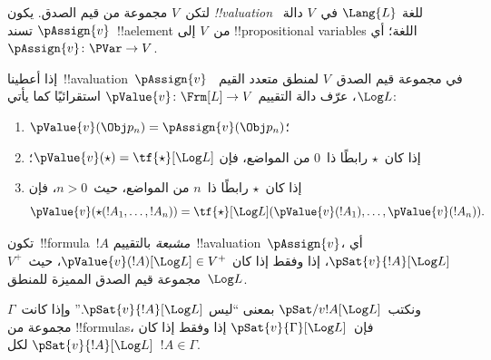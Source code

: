 \documentclass[../../../include/open-logic-section]{subfiles}
\begin{document}


\begin{defn}[!!^{valuation}s]
لتكن~$V$ مجموعة من قيم الصدق. يكون \emph{!!{valuation}} للغة
$\Lang{L}$ في~$V$ دالة~$\pAssign{v}$ تسند~!!a{element} من~$V$ إلى
!!{propositional variable}s اللغة؛ أي
$\pAssign{v} \colon \PVar \to V$.
\end{defn}

\begin{defn}
  إذا أعطينا~!!a{valuation}~$\pAssign{v}$ في مجموعة قيم الصدق~$V$
  لمنطق متعدد القيم~$\Log L$، عرّف دالة التقييم
  $\pValue{v} \colon \Frm[L] \to V$ استقرائيًا كما يأتي:
  \begin{enumerate}
    \item $\pValue{v}(\Obj p_n) = \pAssign{v}(\Obj p_n)$؛
    \item إذا كان~$\star$ رابطًا ذا~$0$ من المواضع، فإن
    $\pValue{v}(\star) = \tf{\star}[\Log L]$؛
    \item إذا كان~$\star$ رابطًا ذا~$n$ من المواضع، حيث~$n>0$، فإن
    \[
      \pValue{v}(\star(!A_1, \dots, !A_n)) = \tf{\star}[\Log L]
      (\pValue{v}(!A_1), \dots, \pValue{v}(!A_n)).
    \]
  \end{enumerate}
\end{defn}

\begin{defn}[الإشباع]
 تكون~!!{formula}~$!A$ \emph{مشبعة}
  بالتقييم~!!a{valuation}~$\pAssign{v}$، أي
  $\pSat{v}{!A}[\Log L]$، إذا وفقط إذا كان
  $\pValue{v}(!A)[\Log L] \in V^+$، حيث~$V^+$ مجموعة قيم الصدق
  المميزة للمنطق~$\Log L$.
  
  ونكتب~$\pSat/{v}{!A}[\Log L]$ بمعنى ``ليس
  $\pSat{v}{!A}[\Log L]$.'' وإذا كانت~$\Gamma$ مجموعة من
  !!{formula}s، فإن~$\pSat{v}{\Gamma}[\Log L]$ إذا وفقط إذا كان
  $\pSat{v}{!A}[\Log L]$ لكل~$!A \in \Gamma$.
\end{defn}
\end{document}
